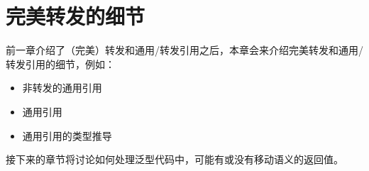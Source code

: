 \chapter{完美转发的细节}
前一章介绍了（完美）转发和通用/转发引用之后，本章会来介绍完美转发和通用/转发引用的细节，例如：

\begin{itemize}
	\item 非转发的通用引用
	\item 通用引用
	\item 通用引用的类型推导
\end{itemize}

接下来的章节将讨论如何处理泛型代码中，可能有或没有移动语义的返回值。





















